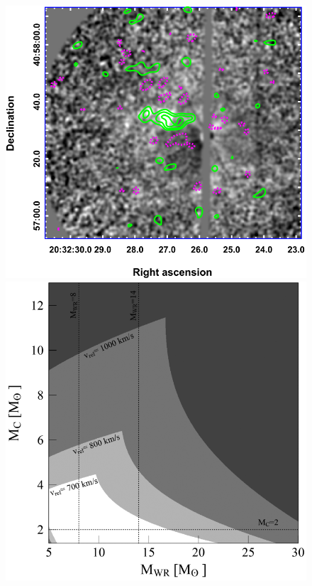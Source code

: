 \documentclass[a4paper,titlepage]{book}     	%
\begin{document}
\begin{figure}[t!]
	\begin{minipage}{.49\textwidth}
		\centering
		\includegraphics[width=\textwidth]{./images/CygX3littlefriend.png}
	\end{minipage}
	\hfill
	\begin{minipage}{.49\textwidth}
		\centering
		\includegraphics[width=\textwidth]{./images/CygX3massBH}	

\end{minipage}
\end{figure}
\end{document}
